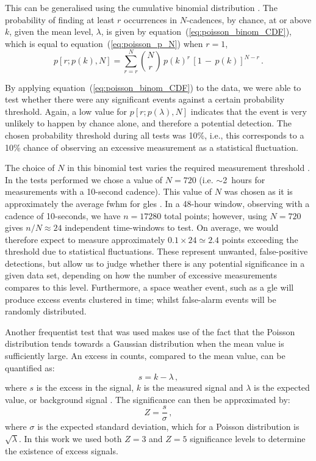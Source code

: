 This can be generalised using the cumulative binomial distribution \citep{basu_asteroseismic_2017}. The probability of finding at least $r$ occurrences in $N$-cadences, by chance, at or above $k$, given the mean level, $\lambda$, is given by equation~(\ref{eq:poisson_binom_CDF}), which is equal to equation~(\ref{eq:poisson_p_N}) when $r=1$,
%
\begin{equation}
p[r; p(k), N] = \sum_{r=r}^{N} \binom{N}{r} \, p(k)^r \, [1 \, - \, p(k)]^{N-r} \, .
\label{eq:poisson_binom_CDF}
\end{equation}

By applying equation~(\ref{eq:poisson_binom_CDF}) to the data, we were able to test whether there were any significant events against a certain probability threshold. Again, a low value for $p[r; p(\lambda), N]$ indicates that the event is very unlikely to happen by chance alone, and therefore a potential detection. The chosen probability threshold during all tests was 10\%, i.e., this corresponds to a 10\% chance of observing an excessive measurement as a statistical fluctuation.

The choice of $N$ in this binomial test varies the required measurement threshold \citep{basu_asteroseismic_2017}. In the tests performed we chose a value of $N=720$ (i.e. $\sim$2~hours for measurements with a 10-second cadence). This value of $N$ was chosen as it is approximately the average \gls{fwhm} for \glspl{gle} \citep{strauss_pulse_2017}. In a 48-hour window, observing with a cadence of 10-seconds, we have $n=17280$ total points; however, using $N=720$ gives $n/N\approx24$ independent time-windows to test. On average, we would therefore expect to measure approximately $0.1 \times 24 \simeq 2.4$ points exceeding the threshold due to statistical fluctuations. These represent unwanted, false-positive detections, but allow us to judge whether there is any potential significance in a given data set, depending on how the number of excessive measurements compares to this level. Furthermore, a space weather event, such as a \gls{gle} will produce excess events clustered in time; whilst false-alarm events will be randomly distributed.


Another frequentist test that was used makes use of the fact that the Poisson distribution tends towards a Gaussian distribution when the mean value is sufficiently large. An excess in counts, compared to the mean value, can be quantified as:
%
\begin{equation}
s = k - \lambda \, ,
\label{eq:poisson_excess}
\end{equation}
%
where $s$ is the excess in the signal, $k$ is the measured signal and $\lambda$ is the expected value, or background signal \citep{lista_statistical_2016}. The significance can then be approximated by:
%
\begin{equation}
Z = \frac{s}{\sigma} \, ,
\label{eq:poisson_significance}
\end{equation}
%
where $\sigma$ is the expected standard deviation, which for a Poisson distribution is $\sqrt{\lambda}$. In this work we used both $Z = 3$ and $Z = 5$ significance levels to determine the existence of excess signals.

